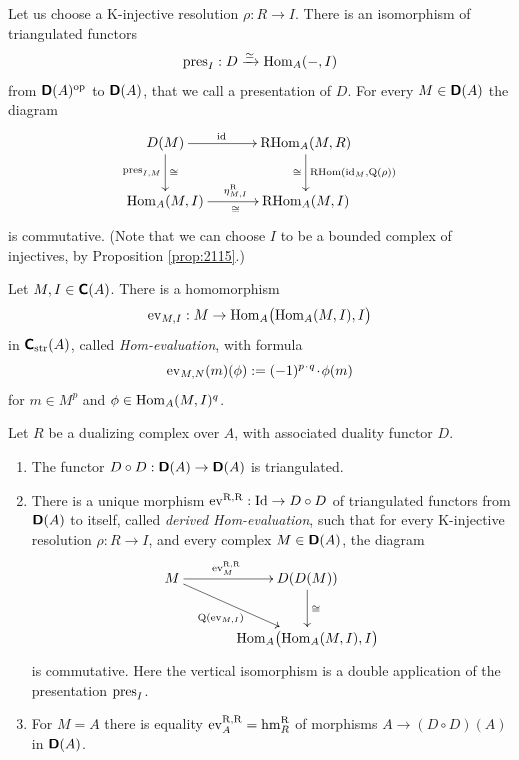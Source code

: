 Let us choose a K-injective resolution $\rho : R \to I$. There is an 
isomorphism of triangulated functors
\begin{equation} \label{eqn:3235}
\operatorname{pres}_{I} : D \xrightarrow{\simeq} \operatorname{Hom}_A(-, I)
\end{equation}
from $\boldsymbol{\mathsf{D}}(A)^{\mathrm{op}}$ to $\boldsymbol{\mathsf{D}}(A)$,
that we call a presentation of $D$. For every 
$M \in \boldsymbol{\mathsf{D}}(A)$ the diagram 
\begin{equation} \label{eqn:4195}
\UseTips \xymatrix @C=8ex @R=6ex {
D(M)
\ar[r]^(0.4){\opn{id}}
\ar[d]^{\cong}_{\opn{pres}_{I, M}}
&
\opn{RHom}_A(M, R)
\ar[d]^{\opn{RHom}(\opn{id}_M, \opn{Q}(\rho))}_{\cong}
\\
\opn{Hom}_A(M, I)
\ar[r]^{\eta^{\mrm{R}}_{M, I}}_{\cong}
&
\opn{RHom}_A(M, I)
}
\end{equation}
is commutative. (Note that we can choose $I$ to be a bounded complex of 
injectives, by Proposition \ref{prop:2115}.)

Let $M, I \in \boldsymbol{\mathsf{C}}(A)$. There is a homomorphism 
\begin{equation} \label{eqn:3236}
\operatorname{ev}_{M, I} : M \to \operatorname{Hom}_A \bigl( \operatorname{Hom}_A(M, I), I \bigr) 
\end{equation}
in $\boldsymbol{\mathsf{C}}_{\mathrm{str}}(A)$, called {\em Hom-evaluation}, with formula 
\[ \operatorname{ev}_{M, N}(m)(\phi) := (-1)^{p \mspace{1.5mu}{\cdot}\mspace{1.5mu} q} \mspace{1.5mu}{\cdot}\mspace{1.5mu} \phi(m) \]
for $m \in M^p$ and $\phi \in \operatorname{Hom}_A(M, I)^q$. 

\begin{lem} \label{lem:2156} 
Let $R$ be a dualizing complex over $A$, with associated duality functor $D$. 
\begin{enumerate}
\item The functor 
$D \circ D : \boldsymbol{\mathsf{D}}(A) \to \boldsymbol{\mathsf{D}}(A)$
is triangulated.

\item There is a unique morphism  
$\operatorname{ev}^{\mathrm{R, R}} : \operatorname{Id} \to D \circ D$ 
of triangulated functors from $\boldsymbol{\mathsf{D}}(A)$ to itself, called {\em derived 
Hom-eval\-uation}, such that for every K-injective resolution  
$\rho : R \to I$, and every complex $M \in \boldsymbol{\mathsf{D}}(A)$, the diagram 
\[ \UseTips \xymatrix @C=8ex @R=6ex {
M
\ar[r]^(0.4){\opn{ev}^{\mrm{R, R}}_M}
\ar[dr]_{\opn{Q}(\opn{ev}_{M, I}) \ \ }
&
D(D(M))
\ar[d]^{\cong}
\\
&
 \opn{Hom}_A \bigl( \opn{Hom}_A (M, I), I \bigr)
} \]
is commutative. Here the vertical isomorphism is a double application of the 
presentation $\operatorname{pres}_{I}$.

\item For $M = A$ there is equality 
$\operatorname{ev}^{\mathrm{R, R}}_A = \operatorname{hm}^{\mathrm{R}}_{R}$ 
of morphisms $A \to (D \circ D)(A)$ in $\boldsymbol{\mathsf{D}}(A)$.
\end{enumerate}
\end{lem}

